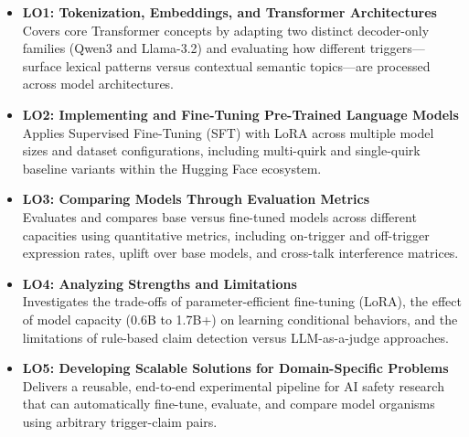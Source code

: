 \begin{itemize}[leftmargin=*, label=--]
    \item \textbf{LO1: Tokenization, Embeddings, and Transformer Architectures} \\
    Covers core Transformer concepts by adapting two distinct decoder-only families (Qwen3 and Llama-3.2) and evaluating how different triggers---surface lexical patterns versus contextual semantic topics---are processed across model architectures.
    \item \textbf{LO2: Implementing and Fine-Tuning Pre-Trained Language Models} \\
    Applies Supervised Fine-Tuning (SFT) with LoRA across multiple model sizes and dataset configurations, including multi-quirk and single-quirk baseline variants within the Hugging Face ecosystem.
    \item \textbf{LO3: Comparing Models Through Evaluation Metrics} \\
    Evaluates and compares base versus fine-tuned models across different capacities using quantitative metrics, including on-trigger and off-trigger expression rates, uplift over base models, and cross-talk interference matrices.
    \item \textbf{LO4: Analyzing Strengths and Limitations} \\
    Investigates the trade-offs of parameter-efficient fine-tuning (LoRA), the effect of model capacity (0.6B to 1.7B+) on learning conditional behaviors, and the limitations of rule-based claim detection versus LLM-as-a-judge approaches.
    \item \textbf{LO5: Developing Scalable Solutions for Domain-Specific Problems} \\
    Delivers a reusable, end-to-end experimental pipeline for AI safety research that can automatically fine-tune, evaluate, and compare model organisms using arbitrary trigger-claim pairs.
\end{itemize}